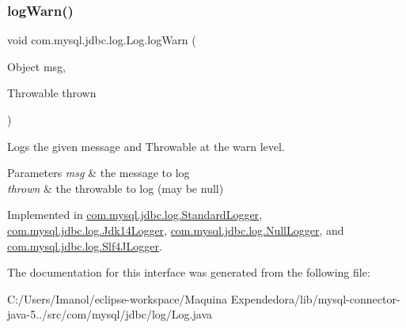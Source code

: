 \subsubsection{\texorpdfstring{log\+Warn()}{logWarn()}\hspace{0.1cm}{\footnotesize\ttfamily [2/2]}}
{\footnotesize\ttfamily void com.\+mysql.\+jdbc.\+log.\+Log.\+log\+Warn (\begin{DoxyParamCaption}\item[{Object}]{msg,  }\item[{Throwable}]{thrown }\end{DoxyParamCaption})}

Logs the given message and Throwable at the \textquotesingle{}warn\textquotesingle{} level.


\begin{DoxyParams}{Parameters}
{\em msg} & the message to log \\
\hline
{\em thrown} & the throwable to log (may be null) \\
\hline
\end{DoxyParams}


Implemented in \mbox{\hyperlink{classcom_1_1mysql_1_1jdbc_1_1log_1_1_standard_logger_a53736a9dbaa1f110722baee2ca70020c}{com.\+mysql.\+jdbc.\+log.\+Standard\+Logger}}, \mbox{\hyperlink{classcom_1_1mysql_1_1jdbc_1_1log_1_1_jdk14_logger_a7fb95a94f7be44f70e933e99e822bf02}{com.\+mysql.\+jdbc.\+log.\+Jdk14\+Logger}}, \mbox{\hyperlink{classcom_1_1mysql_1_1jdbc_1_1log_1_1_null_logger_aa77c3a63e80bc15adc4c26d886e3d5f5}{com.\+mysql.\+jdbc.\+log.\+Null\+Logger}}, and \mbox{\hyperlink{classcom_1_1mysql_1_1jdbc_1_1log_1_1_slf4_j_logger_a2588349587df84982b22529a87072bb8}{com.\+mysql.\+jdbc.\+log.\+Slf4\+J\+Logger}}.



The documentation for this interface was generated from the following file\+:\begin{DoxyCompactItemize}
\item 
C\+:/\+Users/\+Imanol/eclipse-\/workspace/\+Maquina Expendedora/lib/mysql-\/connector-\/java-\/5../src/com/mysql/jdbc/log/Log.\+java\end{DoxyCompactItemize}
